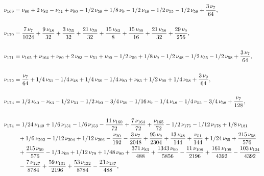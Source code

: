 \documentclass[a4paper,12pt, DIV=14, BCOR=5mm, twoside, headsepline, numbers=noenddot]{scrbook}
\begin{document}
\begin{align}\label{AreaSol15}
\begin{aligned}
\nu_{{169}}&=\nu_{{80}}+2\,\nu_{{83}}-\nu_{{51}}+\nu_{{90}}-1/2\,\nu
_{{59}}+1/8\,\nu_{{9}}-1/2\,\nu_{{48}}-1/2\,\nu_{{55}}-1/2\,\nu_{{58}}
+{\frac {3\,\nu_{{7}}}{64}}, \\
\\
\nu_{{170}}&={\frac {7\,\nu_{{7}}}{1024}}+{
\frac {9\,\nu_{{48}}}{32}}+{\frac {3\,\nu_{{55}}}{32}}+{\frac {21\,\nu
_{{59}}}{32}}+{\frac {15\,\nu_{{83}}}{8}}+{\frac {15\,\nu_{{90}}}{16}}
+{\frac {21\,\nu_{{58}}}{32}}+{\frac {29\,\nu_{{9}}}{256}}, \\
\\
\nu_{{171}}
&=\nu_{{165}}+\nu_{{164}}+\nu_{{80}}+2\,\nu_{{83}}-\nu_{{51}}+\nu_{{90}
}-1/2\,\nu_{{59}}+1/8\,\nu_{{9}}-1/2\,\nu_{{48}}-1/2\,\nu_{{55}}-1/2\,
\nu_{{58}}+{\frac {3\,\nu_{{7}}}{64}}, \\
\\
\nu_{{172}}&={\frac {\nu_{{7}}}{
64}}+1/4\,\nu_{{51}}-1/4\,\nu_{{48}}+1/4\,\nu_{{59}}-1/4\,\nu_{{80}}+
\nu_{{83}}+1/2\,\nu_{{90}}+1/4\,\nu_{{58}}+{\frac {3\,\nu_{{9}}}{64}},\\
\\
\nu_{{173}}&=1/2\,\nu_{{80}}-\nu_{{83}}-1/2\,\nu_{{51}}-1/2\,\nu_{{90}}
-3/4\,\nu_{{59}}-1/16\,\nu_{{9}}-1/4\,\nu_{{48}}-1/4\,\nu_{{55}}-3/4\,
\nu_{{58}}+{\frac {\nu_{{7}}}{128}}, \\
\\
\nu_{{174}}&=1/24\,\nu_{{149}}+1/6
\,\nu_{{151}}-1/6\,\nu_{{153}}-{\frac {11\,\nu_{{160}}}{72}}+{\frac {7
\,\nu_{{164}}}{72}}+{\frac {\nu_{{165}}}{72}}-1/2\,\nu_{{175}}-1/12\,
\nu_{{178}}+1/8\,\nu_{{181}}\\
 &\hphantom{=}+1/6\,\nu_{{202}}-1/12\,\nu_{{204}}+1/12\,
\nu_{{206}}-{\frac {\nu_{{20}}}{192}}-{\frac {3\,\nu_{{7}}}{2048}}+{
\frac {95\,\nu_{{9}}}{2304}}+{\frac {13\,\nu_{{48}}}{144}}+{\frac {\nu
_{{51}}}{144}}+1/24\,\nu_{{55}}+{\frac {215\,\nu_{{58}}}{576}}\\
 &\hphantom{=}+{\frac 
{215\,\nu_{{59}}}{576}}-1/3\,\nu_{{69}}+1/12\,\nu_{{79}}+1/48\,\nu_{{
80}}+{\frac {371\,\nu_{{83}}}{488}}+{\frac {1343\,\nu_{{90}}}{5856}}-{
\frac {11\,\nu_{{108}}}{2196}}+{\frac {161\,\nu_{{109}}}{4392}}-{
\frac {103\,\nu_{{124}}}{4392}}\\
 &\hphantom{=}-{\frac {7\,\nu_{{127}}}{8784}}+{\frac 
{59\,\nu_{{131}}}{2196}}+{\frac {53\,\nu_{{132}}}{8784}}-{\frac {23\,
\nu_{{137}}}{488}}, \\
\\

\end{aligned}
\end{align}
\end{document}
